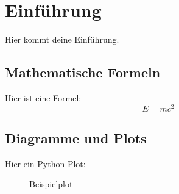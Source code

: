 \documentclass[12pt]{article}
\begin{document}
\chapter{Einführung}
Hier kommt deine Einführung.

\section{Mathematische Formeln}
Hier ist eine Formel:
\[
  E = mc^2
\]

\section{Diagramme und Plots}
Hier ein Python-Plot:
\begin{figure}[h]
  \centering
  \caption{Beispielplot}
\end{figure}
\end{document}
